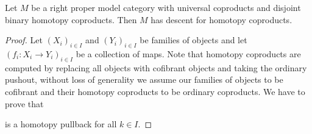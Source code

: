 \begin{corollary}\label{cor:disjointImpliesDescent}
    Let $M$ be a right proper model category with universal coproducts and disjoint binary homotopy coproducts.
    Then $M$ has descent for homotopy coproducts.
    \begin{proof}
        Let $\left(X_i\right)_{i\in I}$ and $\left(Y_i\right)_{i\in I}$ be families of objects and let $\left(f_i\colon X_i\to Y_i\right)_{i\in I}$ be a collection of maps.
        Note that homotopy coproducts are computed by replacing all objects with cofibrant objects and taking the ordinary pushout, without loss of generality we assume our families of objects to be cofibrant and their homotopy coproducts to be ordinary coproducts.
        We have to prove that 
        \begin{center}
        \end{center}
        is a homotopy pullback for all $k\in I$.
        

\end{proof}
\end{corollary}
